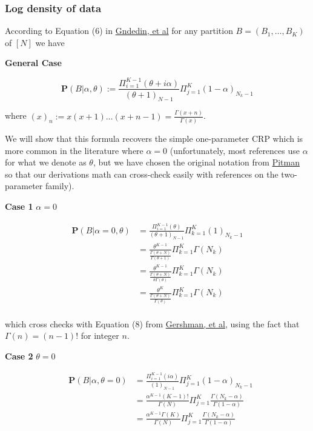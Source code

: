 \documentclass[12pt]{article}
\begin{document}
\subsubsection{Log density of data}

According to Equation (6) in
\href{http://arxiv.org/pdf/0909.3642.pdf}{Gndedin, et al}
for any partition $B=(B_1,\dots,B_K)$ of $[N]$ we have

\textbf{General Case}

\begin{equation}
\mathbf{P}(B|\alpha,\theta)
:= \frac{\Pi_{i=1}^{K-1}(\theta+i\alpha)}{(\theta+1)_{N-1}}\Pi_{j=1}^K(1-\alpha)_{N_k-1}
\label{eq:crp-density}
\end{equation}

where $(x)_n := x(x+1)\dots(x+n-1) = \frac{\Gamma(x+n)}{\Gamma(x)}$.

We will show that this formula recovers the simple one-parameter CRP which is more
common in the literature where $\alpha = 0$ (unfortunately, most references use
$\alpha$ for what we denote as $\theta$, but we have chosen the original notation from
\href{http://link.springer.com/article/10.1007/BF01213386}{Pitman} so that our
derivations math can cross-check easily with references on the two-parameter family).

\textbf{Case 1} $\alpha = 0$

\begin{align*}
\mathbf{P}(B|\alpha=0,\theta)
    & = \frac{\Pi_{i=1}^{K-1}(\theta)}{(\theta+1)_{N-1}}\Pi_{k=1}^K(1)_{N_k-1}\\
   & = \frac{\theta^{K-1}}{\frac{\Gamma(\theta+N)}{\Gamma(\theta+1)}}\Pi_{k=1}^K\Gamma(N_k)\\
   & = \frac{\theta^{K-1}}{\frac{\Gamma(\theta+N)}{\theta\Gamma(\theta)}}\Pi_{k=1}^K\Gamma(N_k)\\
   & = \frac{\theta^{K}}{\frac{\Gamma(\theta+N)}{\Gamma(\theta)}}\Pi_{k=1}^K\Gamma(N_k)\\
\end{align*}

which cross checks with Equation (8) from
\href{http://web.mit.edu/sjgershm/www/GershmanBlei12.pdf#page=4}{Gershman, et al},
using the fact that $\Gamma(n) = (n-1)!$ for integer $n$.

\textbf{Case 2} $\theta = 0$

\begin{eqnarray*}
&\mathbf{P}(B|\alpha,\theta=0)
    & = \frac{\Pi_{i=1}^{K-1}(i\alpha)}{(1)_{N-1}}\Pi_{j=1}^K(1-\alpha)_{N_k-1}\\
&   & = \frac{\alpha^{K-1}(K-1)!}{\Gamma(N)}\Pi_{j=1}^K
            \frac{\Gamma(N_k-\alpha)}{\Gamma(1-\alpha)}\\
&   & = \frac{\alpha^{K-1}\Gamma(K)}{\Gamma(N)}\Pi_{j=1}^K
\frac{\Gamma(N_k-\alpha)}{\Gamma(1-\alpha)}
\end{eqnarray*}
\end{document}
